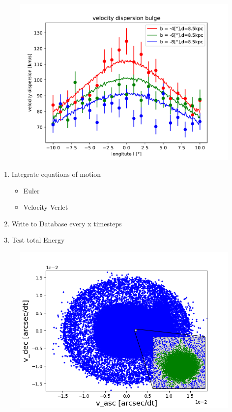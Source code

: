 \documentclass{beamer}
\begin{document}
\begin{frame}
\begin{figure}
\centering
\includegraphics[width=\textwidth,height=\textheight,keepaspectratio]{Images/velocity_dispersion_bulge.pdf}
\end{figure}
\end{frame}


\begin{frame}
\begin{enumerate}
\item Integrate equations of motion
	\begin{itemize}
	\item Euler
	\item Velocity Verlet
	\end{itemize}
\item Write to Database every x timesteps
\item Test total Energy
\end{enumerate}
\end{frame}


\begin{frame}
\begin{figure}
\centering
\includegraphics[width=\textwidth,height=0.8\textheight,keepaspectratio]{Images/title_page.png}
\end{figure}
\end{frame}
\end{document}
